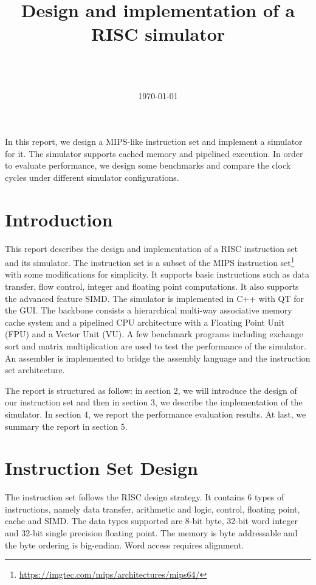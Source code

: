 \documentclass{sig-alternate}
\begin{document}
\title{Design and implementation of a RISC simulator}
\author{
\and
{} \\  \\
}

\date{\today}
\maketitle
\abstract
In this report, we design a MIPS-like instruction set and implement a simulator for it. The simulator supports cached memory and pipelined execution. In order to evaluate performance, we design some benchmarks and compare the clock cycles under different simulator configurations.

\section{Introduction}
This report describes the design and implementation of a RISC instruction set and its simulator. The instruction set is a subset of the MIPS instruction set\footnote{\url{https://imgtec.com/mips/architectures/mips64/}} with some modifications for simplicity. It supports basic instructions such as data transfer, flow control, integer and floating point computations. It also supports the advanced feature SIMD. The simulator is implemented in C++ with QT for the GUI. The backbone consists a hierarchical multi-way associative memory cache system and a pipelined CPU architecture with a Floating Point Unit (FPU) and a Vector Unit (VU). A few benchmark programs including exchange sort and matrix multiplication are used to test the performance of the simulator. An assembler is implemented to bridge the assembly language and the instruction set architecture.

The report is structured as follow: in section 2, we will introduce the design of our instruction set and then in section 3, we describe the implementation of the simulator. In section 4, we report the performance evaluation results.  At last, we summary the report in section 5.

\section{Instruction Set Design}
The instruction set follows the RISC design strategy. It contains 6 types of instructions, namely data transfer, arithmetic and logic, control, floating point, cache and SIMD. The data types supported are 8-bit byte, 32-bit word integer and 32-bit single precision floating point. The memory is byte addressable and the byte ordering is big-endian. Word access requires alignment. 
\end{document}
